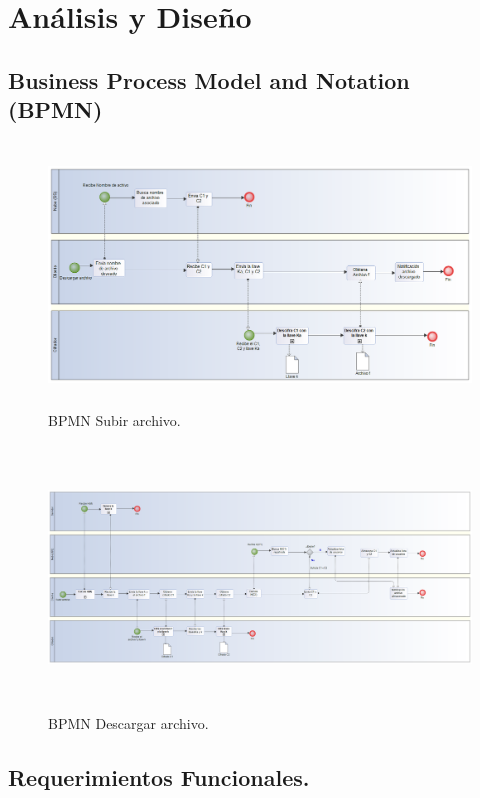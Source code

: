 
\chapter{An\'alisis y Dise\~no} %



\section{Business Process Model and Notation (BPMN)}


\begin{figure}[H]
\centering
	\includegraphics[width=16cm, height=7cm]{./images/bp_descargar.png}
	\caption{BPMN Subir archivo.}

\end{figure}

\begin{figure}[H]
\centering
	\includegraphics[width=16cm, height=7cm]{./images/bp_subir.png}
	\caption{BPMN Descargar archivo.}

\end{figure}

\section{Requerimientos Funcionales. }

